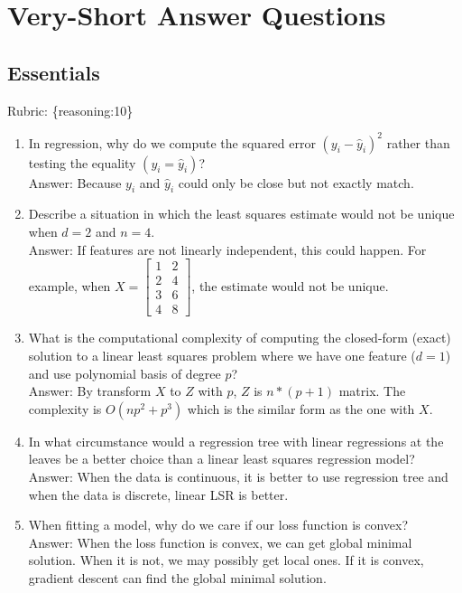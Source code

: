 \documentclass{article}
\def\rubric#1{\gre{Rubric: \{#1\}}}{}
\def\gre#1{{\color{gre}#1}}
\def\enum#1{\begin{enumerate}#1\end{enumerate}}
\begin{document}
\section{Very-Short Answer Questions}

\subsection{Essentials}
\rubric{reasoning:10}

\enum{
\item In regression, why do we compute the squared error $(y_i - \hat{y}_i)^2$ rather than testing the equality $(y_i = \hat{y}_i)$?
\textcolor{gre}{\\Answer: Because $y_i$ and $ \hat{y}_i$ could only be close but not exactly match.}
\item Describe a situation in which the least squares estimate would not be unique when $d=2$ and $n=4$.
\textcolor{gre}{\\Answer: If features are not linearly independent, this could happen. For example, when $X=\left[\begin{array}{cc}
1 & 2\\
2 & 4\\
3&6\\
4&8
\end{array}\right]$, the estimate would not be unique.}
\item What is the computational complexity of computing the closed-form (exact) solution to a linear least squares problem where we have one feature ($d = 1$) and use polynomial basis of degree $p$?
\textcolor{gre}{\\Answer: By transform $X$ to $Z$ with $p$, $Z$ is $n*(p+1)$ matrix. The complexity is $O(np^2+p^3)$ which is the similar form as the one with $X$.}
\item In what circumstance would a regression tree with linear regressions at the leaves be a better choice
than a linear least squares regression model?
\textcolor{gre}{\\Answer: When the data is continuous, it is better to use regression tree and when the data is discrete, linear LSR is better.}
\item When fitting a model, why do we care if our loss function is convex?
\textcolor{gre}{\\Answer: When the loss function is convex, we can get global minimal solution. When it is not, we may possibly get local ones. If it is convex, gradient descent can find the global minimal solution.}
}
\end{document}
